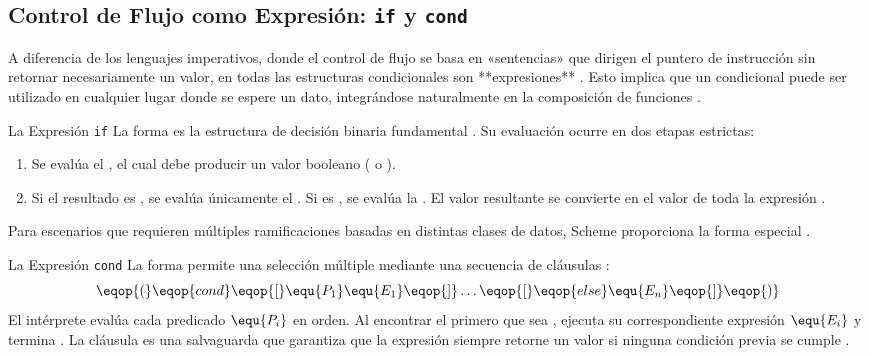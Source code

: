 \subsection{Control de Flujo como Expresión: \texttt{if} y \texttt{cond}}
\label{subsec:4_2_4_control_flujo}

A diferencia de los lenguajes imperativos, donde el control de flujo se basa en «sentencias» que dirigen el puntero de instrucción sin retornar necesariamente un valor, en  todas las estructuras condicionales son **expresiones** \cite{HtDP, SICP}. Esto implica que un condicional puede ser utilizado en cualquier lugar donde se espere un dato, integrándose naturalmente en la composición de funciones \cite{HtDP}.

\begin{definicion}{La Expresión \texttt{if}}
La forma \eqop{(}   \eqop{)} es la estructura de decisión binaria fundamental \cite{SICP}. Su evaluación ocurre en dos etapas estrictas:
\begin{enumerate}
    \item Se evalúa el , el cual debe producir un valor booleano ( o ).
    \item Si el resultado es , se evalúa únicamente el . Si es , se evalúa la . El valor resultante se convierte en el valor de toda la expresión  \cite{SICP}.
\end{enumerate}
\end{definicion}

Para escenarios que requieren múltiples ramificaciones basadas en distintas clases de datos, Scheme proporciona la forma especial  \cite{HtDP}.

\begin{definicion}{La Expresión \texttt{cond}}
La forma  permite una selección múltiple mediante una secuencia de cláusulas \cite{SICP, HtDP}:
\[ \eqop{(}\eqop{cond} \eqop{[}\equ{P_1} \equ{E_1}\eqop{]} \dots \eqop{[}\eqop{else} \equ{E_n}\eqop{]}\eqop{)} \]
El intérprete evalúa cada predicado $\equ{P_i}$ en orden. Al encontrar el primero que sea , ejecuta su correspondiente expresión $\equ{E_i}$ y termina \cite{SICP}. La cláusula  es una salvaguarda que garantiza que la expresión siempre retorne un valor si ninguna condición previa se cumple \cite{HtDP, SICP}.
\end{definicion}

